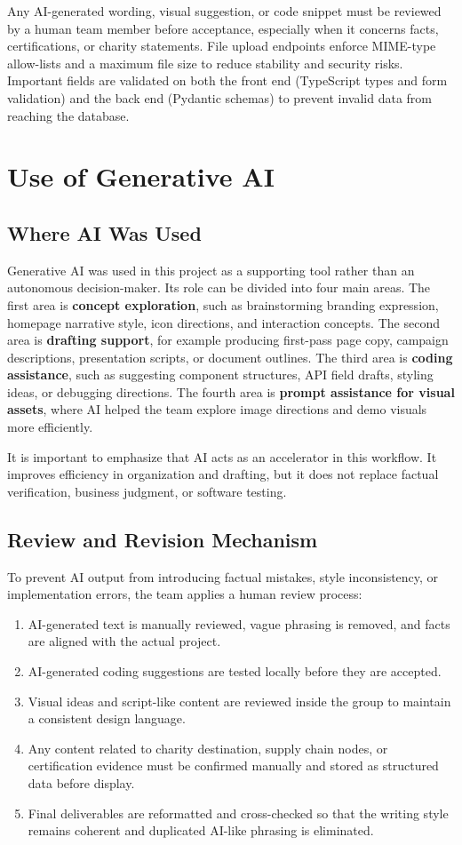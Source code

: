 \documentclass[11pt]{article}
\begin{document}
Any AI-generated wording, visual suggestion, or code snippet must be reviewed by a human team member before acceptance, especially when it concerns facts, certifications, or charity statements. File upload endpoints enforce MIME-type allow-lists and a maximum file size to reduce stability and security risks. Important fields are validated on both the front end (TypeScript types and form validation) and the back end (Pydantic schemas) to prevent invalid data from reaching the database.

\section{Use of Generative AI}
\subsection{Where AI Was Used}
Generative AI was used in this project as a supporting tool rather than an autonomous decision-maker. Its role can be divided into four main areas. The first area is \textbf{concept exploration}, such as brainstorming branding expression, homepage narrative style, icon directions, and interaction concepts. The second area is \textbf{drafting support}, for example producing first-pass page copy, campaign descriptions, presentation scripts, or document outlines. The third area is \textbf{coding assistance}, such as suggesting component structures, API field drafts, styling ideas, or debugging directions. The fourth area is \textbf{prompt assistance for visual assets}, where AI helped the team explore image directions and demo visuals more efficiently.

It is important to emphasize that AI acts as an accelerator in this workflow. It improves efficiency in organization and drafting, but it does not replace factual verification, business judgment, or software testing.

\subsection{Review and Revision Mechanism}
To prevent AI output from introducing factual mistakes, style inconsistency, or implementation errors, the team applies a human review process:
\begin{enumerate}[leftmargin=2.2em]
    \item AI-generated text is manually reviewed, vague phrasing is removed, and facts are aligned with the actual project.
    \item AI-generated coding suggestions are tested locally before they are accepted.
    \item Visual ideas and script-like content are reviewed inside the group to maintain a consistent design language.
    \item Any content related to charity destination, supply chain nodes, or certification evidence must be confirmed manually and stored as structured data before display.
    \item Final deliverables are reformatted and cross-checked so that the writing style remains coherent and duplicated AI-like phrasing is eliminated.
\end{enumerate}
\end{document}
